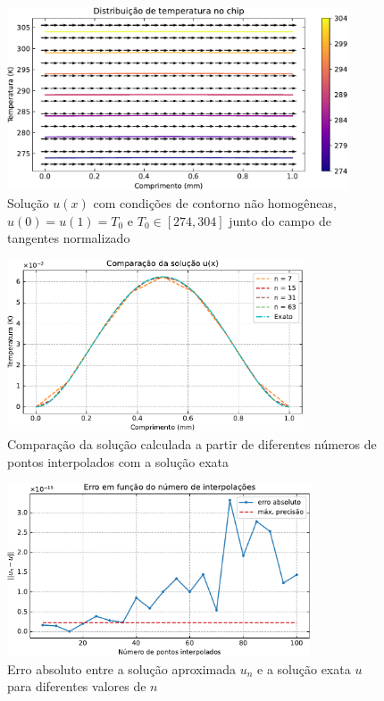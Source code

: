\documentclass[a4,12pt]{horizon-theme}
\begin{document}
\begin{figure}[!ht]
  \centering
  \includegraphics[width=0.9\textwidth]{../plots/val_1.pdf}
  \caption{Solução $u(x)$ com condições de contorno não homogêneas, $u(0) = u(1) = T_0$ e $T_0 \in [274, 304]$ junto do campo de tangentes normalizado}
  \label{fig:val}
\end{figure}

\begin{figure}[!ht]
  \centering
  \includegraphics[width=0.78\textwidth]{../plots/val_1_comp.pdf}
  \caption{Comparação da solução calculada a partir de diferentes números de pontos interpolados com a solução exata}
  \label{fig:val_comp}
\end{figure}

\begin{figure}[!ht]
  \centering
  \includegraphics[width=0.8\textwidth]{../plots/val_1_err.pdf}
  \caption{Erro absoluto entre a solução aproximada $u_n$ e a solução exata $u$ para diferentes valores de $n$}
  \label{fig:val_err}
\end{figure}
\end{document}
